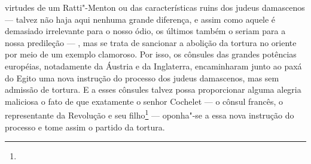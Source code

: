 virtudes de um Ratti"-Menton ou das características ruins dos judeus
damascenos --- talvez não haja aqui nenhuma grande diferença, e assim
como aquele é demasiado irrelevante para o nosso ódio, os últimos
também o seriam para a nossa predileção --- , mas se trata de sancionar a
abolição da tortura no oriente por meio de um exemplo clamoroso. Por
isso, os cônsules das grandes potências européias, notadamente da
Áustria e da Inglaterra, encaminharam junto ao paxá do Egito uma nova
instrução do processo dos judeus damascenos, mas sem admissão de
tortura. E a esses cônsules talvez possa proporcionar alguma alegria
maliciosa o fato de que exatamente o senhor Cochelet --- o cônsul
francês, o representante da Revolução e seu filho\footnote{} --- oponha"-se a essa nova instrução do processo e tome
assim o partido da tortura.



